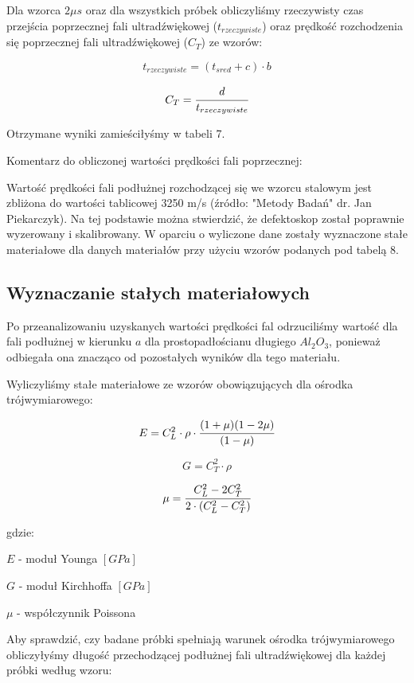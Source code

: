 \documentclass[a4paper,12pt]{article}
\begin{document}
Dla wzorca $2\mu s$ oraz dla wszystkich próbek obliczyliśmy rzeczywisty czas przejścia poprzecznej fali ultradźwiękowej ($t_{rzeczywiste}$) oraz prędkość rozchodzenia się poprzecznej fali ultradźwiękowej ($C_T$) ze wzorów:

$$t_{rzeczywiste}=(t_{sred}+c)\cdot b$$

$$C_T=\cfrac{d}{t_{rzeczywiste}}$$

Otrzymane wyniki zamieściłyśmy w tabeli 7.



Komentarz do obliczonej wartości prędkości fali poprzecznej:

Wartość prędkości fali  podłużnej rozchodzącej się we wzorcu stalowym jest zbliżona do wartości tablicowej 3250 m/s (źródło: "Metody Badań" dr. Jan Piekarczyk). Na tej podstawie można stwierdzić, że defektoskop został poprawnie wyzerowany i skalibrowany.
W oparciu o wyliczone dane zostały wyznaczone stałe materiałowe dla danych materiałów przy użyciu wzorów podanych pod tabelą 8.

\subsection{Wyznaczanie stałych materiałowych}

Po przeanalizowaniu uzyskanych wartości prędkości fal odrzuciliśmy wartość dla fali podłużnej w kierunku $a$ dla prostopadłościanu długiego $Al_2O_3$, ponieważ odbiegała ona znacząco od pozostałych wyników dla tego materiału.





Wyliczyliśmy stałe materiałowe ze wzorów obowiązujących dla ośrodka trójwymiarowego:

$$E=C_L^2\cdot \rho \cdot \cfrac{(1+\mu)(1-2\mu)}{(1-\mu)}$$

$$G=C_T^2\cdot \rho$$

$$\mu = \cfrac{C_L^2-2C_T^2}{2\cdot (C_L^2-C_T^2)}$$

gdzie:

$E$ - moduł Younga $[GPa]$

$G$ - moduł Kirchhoffa $[GPa]$

$\mu$ - współczynnik Poissona





Aby sprawdzić, czy badane próbki spełniają warunek ośrodka trójwymiarowego obliczyłyśmy długość przechodzącej podłużnej fali ultradźwiękowej dla każdej próbki według wzoru:
\end{document}

